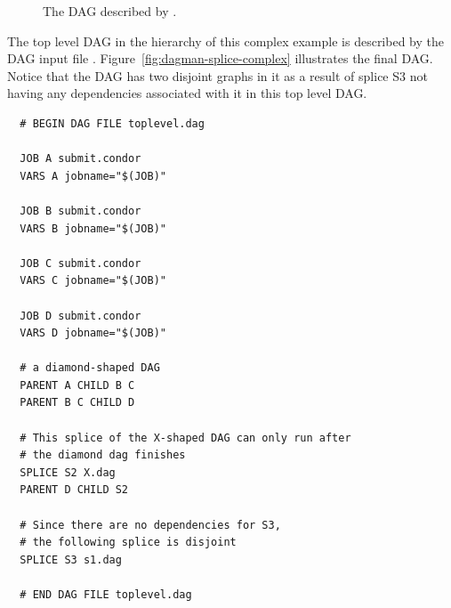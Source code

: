 \begin{figure}



\caption{\label{fig:dagman-splice-s1} The DAG described by .}
\end{figure}

The top level DAG in the hierarchy of this complex example
is described by the DAG input file .
Figure~\ref{fig:dagman-splice-complex} illustrates the final DAG.
Notice that the DAG has two disjoint graphs in it as a result of splice
S3 not having any dependencies associated with it in this top level DAG.

\begin{verbatim}
  # BEGIN DAG FILE toplevel.dag

  JOB A submit.condor
  VARS A jobname="$(JOB)"

  JOB B submit.condor
  VARS B jobname="$(JOB)"

  JOB C submit.condor
  VARS C jobname="$(JOB)"

  JOB D submit.condor
  VARS D jobname="$(JOB)"

  # a diamond-shaped DAG
  PARENT A CHILD B C
  PARENT B C CHILD D

  # This splice of the X-shaped DAG can only run after
  # the diamond dag finishes
  SPLICE S2 X.dag
  PARENT D CHILD S2

  # Since there are no dependencies for S3,
  # the following splice is disjoint 
  SPLICE S3 s1.dag

  # END DAG FILE toplevel.dag
\end{verbatim}


